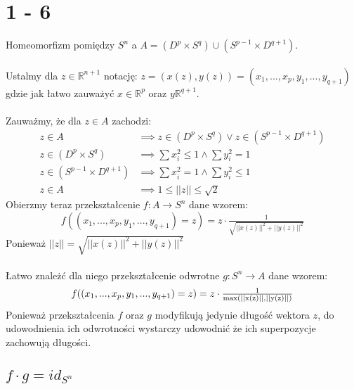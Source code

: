 \section{1 - 6}
Homeomorfizm pomiędzy $ S^n $ a $A = (D^p \times S^q) \cup (S^{p-1} \times D^{q+1})$. \\
\\
Ustalmy dla $ z \in \mathbb{R}^{n+1}$ notację: $  z = (x(z), y(z)) = (x_1, ..., x_p, y_1, ..., y_{q+1}) $ gdzie jak łatwo zauważyć $x \in \mathbb{R}^p$ oraz $y \mathbb{R}^{q+1} $. \\
\\
Zauważmy, że dla $z \in A$ zachodzi:
\begin{align*}
  z \in A & \implies z \in (D^p \times S^q) \lor z \in (S^{p-1} \times D^{q+1}) \\
  z \in (D^p \times S^q) & \implies \sum x_i^2 \leq 1 \land \sum y_i^2 = 1 \\
  z \in (S^{p-1} \times D^{q+1}) & \implies \sum x_i^2 = 1 \land \sum y_i^2 \leq 1 \\
  z \in A & \implies 1 \leq ||z|| \leq \sqrt{2}
\end{align*}
Obierzmy teraz przekształcenie $ f : A \to S^n $ dane wzorem:
\begin{equation*}
  f((x_1, ..., x_p, y_1, ..., y_{q+1}) = z) = z \cdot \tfrac{1}{\sqrt{||x(z)||^2 + ||y(z)||^2}}
\end{equation*}
Ponieważ $ ||z|| = \sqrt{||x(z)||^2 + ||y(z)||^2} $\\
\\
Łatwo znależć dla niego przekształcenie odwrotne $ g : S^n \to A $ dane wzorem:
\begin{equation*}
  f((x_1, ..., x_p, y_1, ..., y_{q+1}) = z) = z \cdot \tfrac{1}{\rm max(||x(z)||, ||y(z)||)}
\end{equation*} 
Ponieważ przekształcenia $f$ oraz $g$ modyfikują jedynie długość wektora $z$, do udowodnienia ich odwrotności wystarczy udowodnić że ich superpozycje zachowują długości.

\subsection{$f \cdot g = id_{S^n}$}
